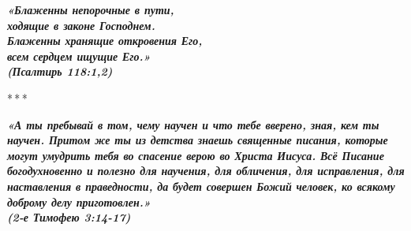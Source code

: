 \documentclass[fontsize=16pt,letterpaper,DIV=6]{scrartcl}
\begin{document}
{\centering\Large\itshape\bfseries «Блаженны непорочные в пути,\\ ходящие в законе Господнем.\\
Блаженны хранящие откровения Его,\\ всем сердцем ищущие Его.»\\
(Псалтирь 118:1,2)
\par}
\centerline{*\,*\,*}
{\centering\Large\itshape\bfseries «А ты пребывай в том, чему научен и что тебе вверено, зная, кем ты научен.
Притом же ты из детства знаешь священные писания, которые могут умудрить тебя во спасение верою во Христа Иисуса. 
Всё Писание богодухновенно и полезно для научения, для обличения, для исправления, для наставления в праведности, да будет совершен Божий человек, ко всякому доброму делу приготовлен.»\\

(2-е Тимофею 3:14-17)\par}
\end{document}
